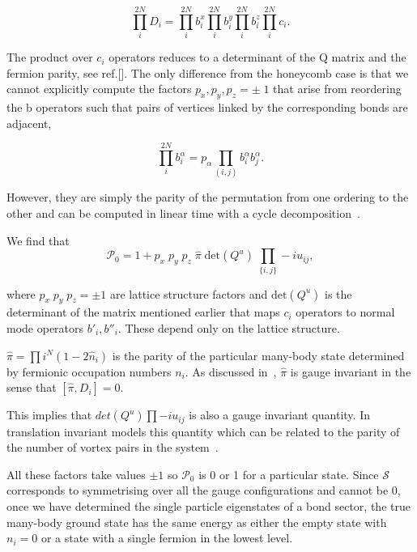 \[\prod_i^{2N} D_i = \prod_i^{2N} b^x_i \prod_i^{2N} b^y_i \prod_i^{2N} b^z_i \prod_i^{2N} c_i.\]

The product over \(c_i\) operators reduces to a determinant of the Q matrix and the fermion parity, see ref.{[}\textcite{pedrocchiPhysicalSolutionsKitaev2011}{]}. The only difference from the honeycomb case is that we cannot explicitly compute the factors \(p_x,p_y,p_z = \pm\;1\) that arise from reordering the b operators such that pairs of vertices linked by the corresponding bonds are adjacent,

\[\prod_i^{2N} b^\alpha_i = p_\alpha \prod_{(i,j)}b^\alpha_i b^\alpha_j.\]

However, they are simply the parity of the permutation from one ordering to the other and can be computed in linear time with a cycle decomposition~\autocite{sedgewickPermutationGenerationMethods1977}.

We find that \[\mathcal{P}_0 = 1 + p_x\;p_y\;p_z\; \hat{\pi} \; \mathrm{det}(Q^u) \; \prod_{\{i,j\}} -iu_{ij},\]

where \(p_x\;p_y\;p_z = \pm 1\) are lattice structure factors and \(\mathrm{det}(Q^u)\) is the determinant of the matrix mentioned earlier that maps \(c_i\) operators to normal mode operators \(b'_i, b''_i\). These depend only on the lattice structure.

\(\hat{\pi} = \prod{i}^{N} (1 - 2\hat{n}_i)\) is the parity of the particular many-body state determined by fermionic occupation numbers \(n_i\). As discussed in~\autocite{pedrocchiPhysicalSolutionsKitaev2011}, \(\hat{\pi}\) is gauge invariant in the sense that \([\hat{\pi}, D_i] = 0\).

This implies that \(det(Q^u) \prod -i u_{ij}\) is also a gauge invariant quantity. In translation invariant models this quantity which can be related to the parity of the number of vortex pairs in the system~\autocite{yaoAlgebraicSpinLiquid2009}.

All these factors take values \(\pm 1\) so \(\mathcal{P}_0\) is 0 or 1 for a particular state. Since \(\mathcal{S}\) corresponds to symmetrising over all the gauge configurations and cannot be 0, once we have determined the single particle eigenstates of a bond sector, the true many-body ground state has the same energy as either the empty state with \(n_i = 0\) or a state with a single fermion in the lowest level.

